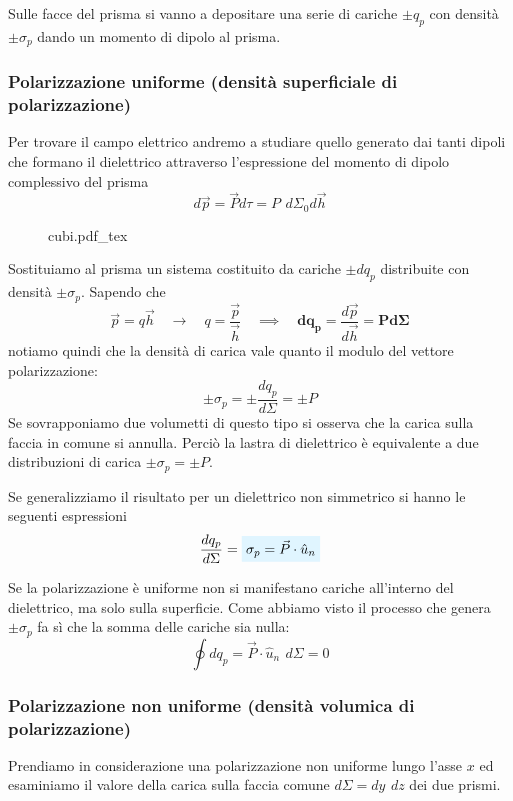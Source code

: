 \documentclass[x11names]{report}
\newcommand{\incfig}[1]{%
	{#1.pdf_tex}
}
\newcommand{\viola}[1]{%
	\colorbox{myblue}{$\displaystyle #1$}
}
\begin{document}
Sulle facce del prisma si vanno a depositare una serie di cariche \(\pm q_p\) con densità \(\pm \sigma_p\) dando un momento di dipolo al prisma.

\subsubsection{Polarizzazione uniforme (densità superficiale di polarizzazione)}
Per trovare il campo elettrico andremo a studiare quello generato dai tanti dipoli che formano il dielettrico attraverso l'espressione del momento di dipolo complessivo del prisma
\[
d\vec{p} = \vec{P}d\tau = P \,\ d\Sigma_0 d\vec{h}
\]

\begin{figure}[H]
	\centering
	\incfig{cubi}
\end{figure}

Sostituiamo al prisma un sistema costituito da cariche \(\pm dq_p\) distribuite con densità \(\pm\sigma_p\). Sapendo che 
\[
\vec{p} = q \vec{h} \quad \to \quad q = \frac{\vec{p}}{\vec{h}} \quad \implies \quad \boldsymbol{dq_p =} \frac{d\vec{p}}{d\vec{h}} \boldsymbol{= Pd\Sigma}
\]
notiamo quindi che la densità di carica vale quanto il modulo del vettore polarizzazione:
\[
\pm\sigma_p = \pm\frac{dq_p}{d\Sigma} =\pm P
\]
Se sovrapponiamo due volumetti di questo tipo si osserva che la carica sulla faccia in comune si annulla. Perciò la lastra di dielettrico è equivalente a due distribuzioni di carica \(\pm \sigma_p = \pm P\).

Se generalizziamo il risultato per un dielettrico non simmetrico si hanno le seguenti espressioni 
\begin{equation}
	\frac{dq_p}{d\Sigma} = \viola{\sigma_p = \vec{P} \cdot \hat{u}_n  }
\end{equation}



Se la polarizzazione è uniforme non si manifestano cariche all'interno del dielettrico, ma solo sulla superficie. Come abbiamo visto il processo che genera \(\pm \sigma_p\) fa sì che la somma delle cariche sia nulla:
\[
\oint dq_p =  \vec{P} \cdot \hat{u}_n \,\ d\Sigma = 0
\]

\subsubsection{Polarizzazione non uniforme (densità volumica di polarizzazione)}
Prendiamo in considerazione una polarizzazione non uniforme lungo l'asse \(x\)  ed esaminiamo il valore della carica sulla faccia comune \(d\Sigma = dy \,\ dz \) dei due prismi.
\end{document}

